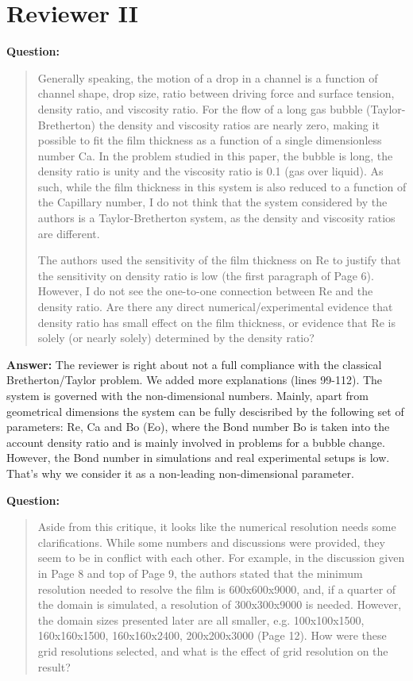 \documentclass{article}
\begin{document}
\section{Reviewer II}

\textbf{Question:}
\begin{quotation}
Generally speaking, the motion of a drop in a channel is a function of channel shape, drop size,
ratio between driving force and surface tension, density ratio, and viscosity ratio.  For the flow
of a long gas bubble (Taylor-Bretherton) the density and viscosity ratios are nearly zero, making it
possible to fit the film thickness as a function of a single dimensionless number Ca.  In the
problem studied in this paper, the bubble is long, the density ratio is unity and the viscosity
ratio is 0.1 (gas over liquid).  As such, while the film thickness in this system is also reduced to
a function of the Capillary number, I do not think that the system considered by the authors is a
Taylor-Bretherton system, as the density and viscosity ratios are different.

The authors used the sensitivity of the film thickness on Re to justify that the sensitivity on
density ratio is low (the first paragraph of Page 6).  However, I do not see the one-to-one
connection between Re and the density ratio.  Are there any direct numerical/experimental evidence
that density ratio has small effect on the film thickness, or evidence that Re is solely (or nearly
solely) determined by the density ratio?
\end{quotation}

\textbf{Answer:}  The reviewer is right about not a full compliance with the classical
Bretherton/Taylor problem. We added more explanations (lines 99-112). The system is governed with
the non-dimensional numbers. Mainly, apart from geometrical dimensions the system can be fully
descisribed by the following set of parameters: Re, Ca and Bo (Eo), where the Bond number Bo is
taken into the account density ratio and is mainly involved in problems for a bubble change.
However, the Bond number in simulations and real experimental setups is low. That's why we consider
it as a non-leading non-dimensional parameter. 
 
\textbf{Question:}
\begin{quotation}
Aside from this critique, it looks like the numerical resolution needs some clarifications.  While
some numbers and discussions were provided, they seem to be in conflict with each other.  For
example, in the discussion given in Page 8 and top of Page 9, the authors stated that the minimum
resolution needed to resolve the film is 600x600x9000, and, if a quarter of the domain is simulated,
a resolution of 300x300x9000 is needed.  However, the domain sizes presented later are all smaller,
e.g. 100x100x1500, 160x160x1500, 160x160x2400, 200x200x3000 (Page 12).  How were these grid
resolutions selected, and what is the effect of grid resolution on the result?
\end{quotation}
\end{document}
